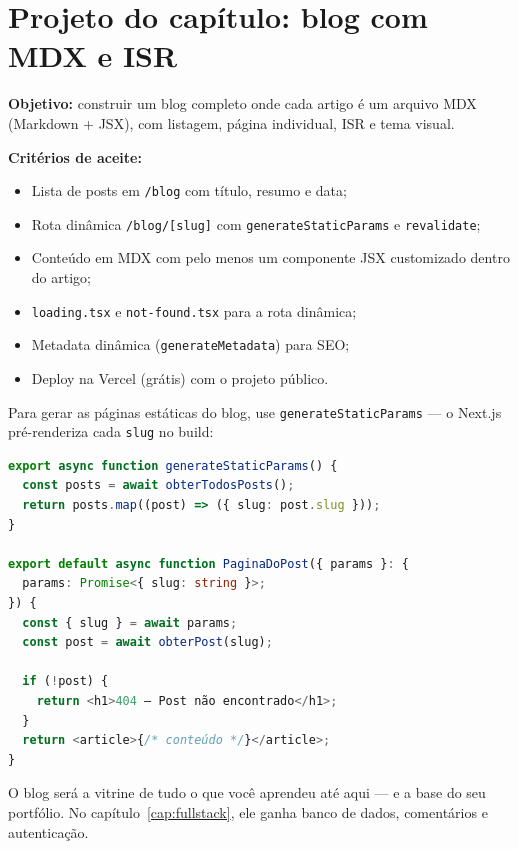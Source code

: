 \section{Projeto do capítulo: blog com MDX e ISR}
\label{sec:projeto8}

\begin{caixaprojeto}
\textbf{Objetivo:} construir um blog completo onde cada artigo é um arquivo
MDX (Markdown + JSX), com listagem, página individual, ISR e tema visual.

\textbf{Critérios de aceite:}
\begin{itemize}[leftmargin=*, itemsep=0.2em]
  \item Lista de posts em \texttt{/blog} com título, resumo e data;
  \item Rota dinâmica \texttt{/blog/[slug]} com \texttt{generateStaticParams} e \texttt{revalidate};
  \item Conteúdo em MDX com pelo menos um componente JSX customizado dentro do artigo;
  \item \texttt{loading.tsx} e \texttt{not-found.tsx} para a rota dinâmica;
  \item Metadata dinâmica (\texttt{generateMetadata}) para SEO;
  \item Deploy na Vercel (grátis) com o projeto público.
\end{itemize}
\end{caixaprojeto}

Para gerar as páginas estáticas do blog, use \texttt{generateStaticParams} —
o Next.js pré-renderiza cada \texttt{slug} no build:

\begin{lstlisting}[style=livro, language=TypeScript,
  caption={generateStaticParams + not-found.}, label={list:nextjs-params}]
export async function generateStaticParams() {
  const posts = await obterTodosPosts();
  return posts.map((post) => ({ slug: post.slug }));
}

export default async function PaginaDoPost({ params }: {
  params: Promise<{ slug: string }>;
}) {
  const { slug } = await params;
  const post = await obterPost(slug);

  if (!post) {
    return <h1>404 — Post não encontrado</h1>;
  }
  return <article>{/* conteúdo */}</article>;
}
\end{lstlisting}

\begin{caixadica}
O blog será a vitrine de tudo o que você aprendeu até aqui — e a base do seu
portfólio. No capítulo~\ref{cap:fullstack}, ele ganha banco de dados,
comentários e autenticação.
\end{caixadica}

